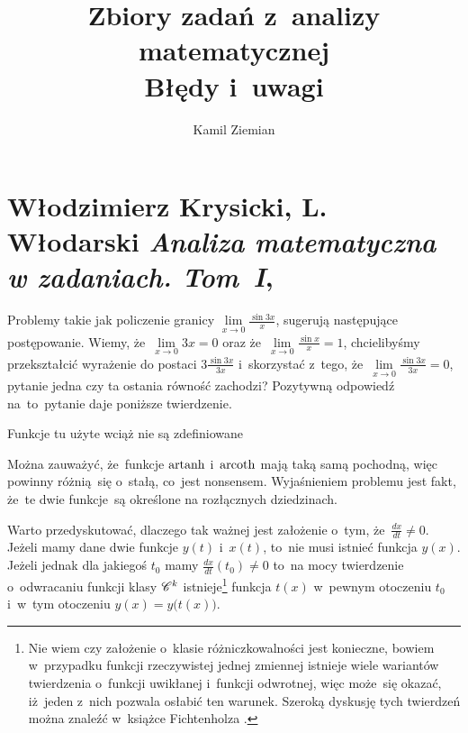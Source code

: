 \documentclass[a4paper,11pt]{article}
\title{Zbiory zadań z~analizy matematycznej \\
  {\Large Błędy i~uwagi}}
\author{Kamil Ziemian}
\numberwithin{equation}{section}
\begin{document}





\maketitle  %





\section{Włodzimierz Krysicki, L. Włodarski
  \textit{Analiza matematyczna w zadaniach. Tom~I},
  \cite{KrysickiWlodarskiAnalizaWZadaniachVolI2005}}




\noindent
{} Problemy takie jak policzenie granicy
$\lim\limits_{ x \to 0 } \frac{ \sin 3 x }{ x }$, sugerują następujące
postępowanie. Wiemy, że~$\lim\limits_{ x \to 0 } 3x = 0$ oraz
że~$\lim\limits_{ x \to 0 } \frac{ \sin x }{ x } = 1$, chcielibyśmy
przekształcić wyrażenie do postaci $3 \frac{ \sin 3x }{ 3x }$
i~skorzystać z~tego, że~$\lim\limits_{ x \to 0 } \frac{ \sin 3x }{ 3x } = 0$,
pytanie jedna czy ta ostania równość zachodzi? Pozytywną odpowiedź
na~to~pytanie daje poniższe twierdzenie.

Funkcje tu użyte wciąż nie są zdefiniowane

\VerSpaceFour





\noindent
{} Można zauważyć, że~funkcje $\operatorname{artanh}$ i~$\operatorname{arcoth}$ mają taką samą
pochodną, więc powinny różnią~się o~stałą, co~jest nonsensem. Wyjaśnieniem
problemu jest fakt, że~te dwie funkcje~są określone na rozłącznych
dziedzinach.

\VerSpaceFour





\noindent
{} Warto przedyskutować, dlaczego tak ważnej jest
założenie o~tym, że~$\frac{ dx }{ dt } \neq 0$. Jeżeli mamy dane dwie
funkcje $y( t )$ i~$x( t )$, to~nie musi istnieć funkcja $y( x )$.
Jeżeli jednak dla jakiegoś $t_{ 0 }$ mamy
$\frac{ dx }{ dt }( t_{ 0 } ) \neq 0$ to~na mocy twierdzenie
o~odwracaniu funkcji klasy $\mathcal{C}^{ k }$ istnieje\footnote{Nie wiem czy
  założenie o~klasie różniczkowalności jest konieczne, bowiem
  w~przypadku funkcji rzeczywistej jednej zmiennej istnieje wiele
  wariantów twierdzenia o~funkcji uwikłanej i~funkcji odwrotnej, więc
  może~się okazać, iż~jeden z~nich pozwala osłabić ten warunek.
  Szeroką dyskusję tych twierdzeń można znaleźć w~książce Fichtenholza
  \cite{FichtenholzRachunekRozniczkowyETCVolI2005}.} funkcja $t( x )$ w~pewnym
otoczeniu $t_{ 0 }$ i~w~tym otoczeniu $y( x ) = y\big( t( x ) \big)$.
\end{document}
